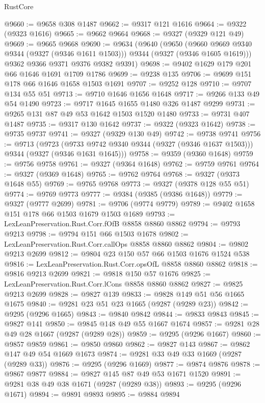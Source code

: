 \begin{lexlean}{RustCore}
\begin{coremodule}
@9660 := @9658 @308 @1487
@9662 := @9317 @121 @1616
@9664 := @9322 (@9323 @1616)
@9665 := @9662 @9664
@9668 := @9327 (@9329 @121 @49)
@9669 := @9665 @9668
@9690 := @9634
    (@9640
      (@9650
        (@9660 @9669 @9340 @9344 (@9327 (@9346 @1611 @1503)))
        @9344
        (@9327 (@9346 @1605 @1619)))
      @9362
      @9366
      @9371
      @9376
      @9382
      @9391)
@9698 := @9402 @1629 @179 @201 @66 @1646 @1691 @1709 @1786
@9699 := @9238 @135
@9706 := @9699 @151 @178 @66 @1646 @1658 @1503 @1691
@9707 := @9252 @128
@9710 := @9707 @134 @55 @51
@9713 := @9710 @1646 @1656 @1648
@9717 := @9266 @133 @49 @54 @1490
@9723 := @9717 @1645 @1655 @1480 @326 @1487 @9299
@9731 := @9265 @131 @87 @49 @53 @1642 @1503 @1520 @1480
@9733 := @9731 @407 @1487
@9735 := @9317 @130 @1642
@9737 := @9322 (@9323 @1642)
@9738 := @9735 @9737
@9741 := @9327 (@9329 @130 @49)
@9742 := @9738 @9741
@9756 := @9713
    (@9723 (@9733 @9742 @9340 @9344 (@9327 (@9346 @1637 @1503))) @9344 (@9327 (@9346 @1631 @1645)))
@9758 := @9359 (@9360 @1648)
@9759 := @9756 @9758
@9761 := @9327 (@9364 @1648)
@9762 := @9759 @9761
@9764 := @9327 (@9369 @1648)
@9765 := @9762 @9764
@9768 := @9327 (@9373 @1648 @55)
@9769 := @9765 @9768
@9773 := @9327 (@9378 @128 @55 @51)
@9774 := @9769 @9773
@9777 := @9384 (@9385 (@9386 @1648))
@9779 := @9327 (@9777 @2699)
@9781 := @9706 (@9774 @9779)
@9789 := @9402 @1658 @151 @178 @66 @1503 @1679 @1503 @1689
@9793 := LexLeanPreservation.Rust.Corr.fOfB @8858 @8860 @8862
@9794 := @9793 @9213
@9798 := @9794 @151 @66 @1503 @1678
@9802 := LexLeanPreservation.Rust.Corr.callOps @8858 @8860 @8862
@9804 := @9802 @9213 @2699
@9812 := @9804 @23 @150 @57 @66 @1503 @1676 @1524 @538
@9816 := LexLeanPreservation.Rust.Corr.opsOfL @8858 @8860 @8862
@9818 := @9816 @9213 @2699
@9821 := @9818 @150 @57 @1676
@9825 := LexLeanPreservation.Rust.Corr.lCons @8858 @8860 @8862
@9827 := @9825 @9213 @2699
@9828 := @9827 @139
@9833 := @9828 @149 @51 @56 @1665 @1675
@9840 := @9281 @23 @51 @23 @1665 (@9287 (@9289 @23))
@9842 := @9295 (@9296 @1665)
@9843 := @9840 @9842
@9844 := @9833 @9843
@9845 := @9827 @141
@9850 := @9845 @148 @49 @55 @1667 @1674
@9857 := @9281 @28 @49 @28 @1667 (@9287 (@9289 @28))
@9859 := @9295 (@9296 @1667)
@9860 := @9857 @9859
@9861 := @9850 @9860
@9862 := @9827 @143
@9867 := @9862 @147 @49 @54 @1669 @1673
@9874 := @9281 @33 @49 @33 @1669 (@9287 (@9289 @33))
@9876 := @9295 (@9296 @1669)
@9877 := @9874 @9876
@9878 := @9867 @9877
@9884 := @9827 @145 @87 @49 @53 @1671 @1520
@9891 := @9281 @38 @49 @38 @1671 (@9287 (@9289 @38))
@9893 := @9295 (@9296 @1671)
@9894 := @9891 @9893
@9895 := @9884 @9894

\end{coremodule}
\end{lexlean}
